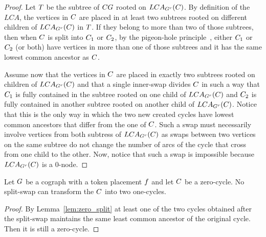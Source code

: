 \documentclass[msc,english,table,xcdraw]{ppgccufmg}
\begin{document}
\begin{proof}
Let $T$ be the subtree of $CG$ rooted on $LCA_{G^{r}}(C)$. 
By definition of the $LCA$, the vertices in $C$ are placed in at least two subtrees rooted on different children of $LCA_{G^{r}}(C)$ in $T$. 
If they belong to more than two of those subtrees, then when $C$ is split into $C_{1}$ or $C_{2}$, by the pigeon-hole principle~\cite{Erdos:1987,Razborov:2002}, either $C_{1}$ or $C_{2}$ (or both) have vertices in more than one of those subtrees and it has the same lowest common ancestor as $C$.

Assume now that the vertices in $C$ are placed in exactly two subtrees rooted on children of $LCA_{G^{r}}(C)$ and that a single inner-swap divides $C$ in such a way that $C_{1}$ is fully contained in the subtree rooted on one child of $LCA_{G^{r}}(C)$ and $C_{2}$ is fully contained in another subtree rooted on another child of $LCA_{G^{r}}(C)$. 
Notice that this is the only way in which the two new created cycles have lowest common ancestors that differ from the one of $C$.
Such a swap must necessarily involve vertices from both subtress of $LCA_{G^{r}}(C)$ as swaps between two vertices on the same subtree do not change the number of arcs of the cycle that cross from one child to the other. 
Now, notice that such a swap is impossible because $LCA_{G^{r}}(C)$ is a 0-node.   
\end{proof}


\begin{lemma}
\label{lem:zero_split2}
Let $G$ be a cograph with a  token placement $f$ and let $C$ be a zero-cycle. No split-swap can transform the $C$ into two one-cycles.
\end{lemma}
\begin{proof}
By Lemma~\ref{lem:zero_split} at least one of the two cycles obtained after the split-swap maintains the same least common ancestor of the original cycle. Then it is still a zero-cycle.
\end{proof}

\end{document}
